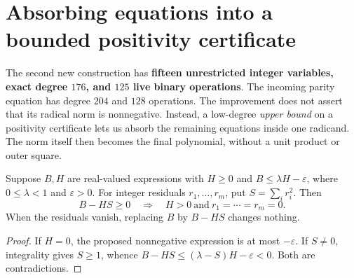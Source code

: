 \section{Absorbing equations into a bounded positivity certificate}
\label{sec:bounded-guard-absorption}

The second new construction has \textbf{fifteen unrestricted integer
variables, exact degree $176$, and $125$ live binary operations}.
The incoming parity equation has degree $204$ and $128$ operations.
The improvement does not assert that its radical norm is nonnegative.
Instead, a low-degree \emph{upper bound} on a positivity certificate lets
us absorb the remaining equations inside one radicand. The norm itself
then becomes the final polynomial, without a unit product or outer square.

\begin{lemma}
\label{lem:bounded-absorption}
Suppose $B,H$ are real-valued expressions with $H\geq0$ and
$B\leq\lambda H-\varepsilon$, where $0\leq\lambda<1$ and
$\varepsilon>0$. For integer residuals $r_1,\ldots,r_m$, put
$S=\sum_i r_i^2$. Then
\[
 B-HS\geq0\quad\Longrightarrow\quad H>0\ \text{and}\ r_1=\cdots=r_m=0.
\]
When the residuals vanish, replacing $B$ by $B-HS$ changes nothing.
\end{lemma}
\begin{proof}
If $H=0$, the proposed nonnegative expression is at most
$-\varepsilon$. If $S\neq0$, integrality gives $S\geq1$, whence
$B-HS\leq(\lambda-S)H-\varepsilon<0$. Both are contradictions.
\end{proof}

